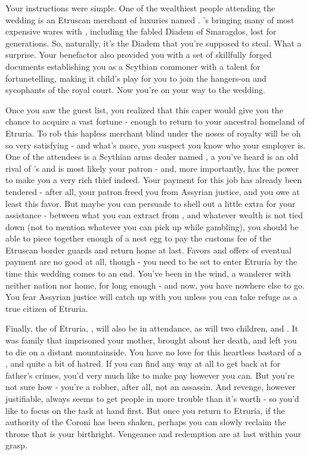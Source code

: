 \documentclass[char]{Kos}
\begin{document}
Your instructions were simple. One of the wealthiest people attending the wedding is an Etruscan merchant of luxuries named \cMerchant{}. \cMerchant{\They}'s bringing many of \cMerchant{\their} most expensive wares with \cMerchant{\them}, including the fabled Diadem of Smaragdos, lost for generations. So, naturally, it's the Diadem that you're supposed to steal. What a surprise. Your benefactor also provided you with a set of skillfully forged documents establishing you as a Scythian commoner with a talent for fortunetelling, making it child's play for you to join the hangers-on and sycophants of the royal court. Now you're on your way to the wedding. 
    
Once you saw the guest list, you realized that this caper would give you the chance to acquire a vast fortune - enough to return to your ancestral homeland of Etruria. To rob this hapless merchant blind under the noses of royalty will be oh so very satisfying - and what's more, you suspect you know who your employer is. One of the attendees is a Scythian arms dealer named \cArmsDealer{}, a \cArmsDealer{\human} you've heard is an old rival of \cMerchant{}'s and is most likely your patron - and, more importantly, \cArmsDealer{\they} has the power to make you a very rich thief indeed. Your payment for this job has already been tendered - after all, your patron freed you from Assyrian justice, and you owe \cArmsDealer{\them} at least this favor. But maybe you can persuade \cArmsDealer{\them} to shell out a little extra for your assistance - between what you can extract from \cArmsDealer{\them}, and whatever wealth is not tied down (not to mention whatever you can pick up while gambling), you should be able to piece together enough of a nest egg to pay the customs fee of the Etruscan border guards and return home at last.  Favors and offers of eventual payment are no good at all, though - you need to be set to enter Etruria by the time this wedding comes to an end. You've been in the wind, a wanderer with neither nation nor home, for long enough - and now, you have nowhere else to go. You fear Assyrian justice will catch up with you unless you can take refuge as a true citizen of Etruria.

    Finally, the \cEtruriaKing{\monarch} of Etruria, \cEtruriaKing{}, will also be in attendance, as will \cEtruriaKing{\their} two children, \cGroom{} and \cPoet{}. It was \cEtruriaKing{\their} family that imprisoned your mother, brought about her death, and left you to die on a distant mountainside. You have no love for this heartless bastard of a \cEtruriaKing{\human}, and quite a bit of hatred. If you can find any way at all to get back at \cEtruriaKing{} for \cEtruriaKing{\their} father's crimes, you'd very much like to make \cEtruriaKing{\them} pay however you can. But you're not sure how - you're a robber, after all, not an assassin. And revenge, however justifiable, always seems to get people in more trouble than it's worth - so you'd like to focus on the task at hand first. But once you return to Etruria, if the authority of the Coroni has been shaken, perhaps you can slowly reclaim the throne that is your birthright. Vengeance and redemption are at last within your grasp. 
\end{document}

